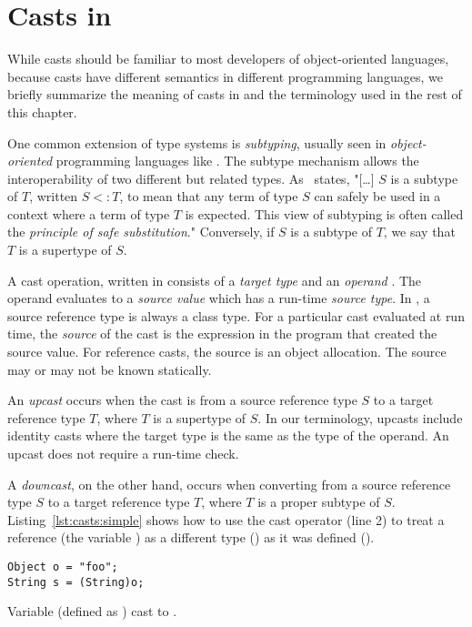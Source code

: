\section{Casts in \java{}}
\label{sec:casts:background}

While casts should be familiar to most developers of object-oriented languages,
because casts have different semantics in different programming languages,
we briefly summarize the meaning of casts in \java{} and the terminology used in the rest of this chapter.

One common extension of type systems is \emph{subtyping},
usually seen in \emph{object-oriented} programming languages like \java{}.
The subtype mechanism allows the interoperability of two different but related types.
As~\cite{pierceTypesProgrammingLanguages2002} states,
"[\ldots] $S$ is a subtype of $T$, written $S <: T$,
to mean that any term of type $S$ can safely be used in a context where a term of type $T$ is expected.
This view of subtyping is often called the \emph{principle of safe substitution}."
Conversely, if $S$ is a subtype of $T$, we say that $T$ is a supertype of $S$.

A cast operation, written  in \java{}
consists of a \emph{target type}  and an \emph{operand} .
The operand evaluates to a \emph{source value} which has a run-time
\emph{source type}.
In \java{}, a source reference type is always a class type.
For a particular cast evaluated at run time, 
the \emph{source} of the cast is the expression in the program that
created the source value.
For reference casts, the source is an object allocation.
The source may or may not be known statically.

An \emph{upcast} occurs when the cast is from a source reference type $S$ to a target reference type $T$,
where $T$ is a supertype of $S$.
In our terminology, upcasts include identity casts where the target type
is the same as the type of the operand.
An upcast does not require a run-time check.

A \emph{downcast}, on the other hand,
occurs when converting from a source reference type $S$ to a target reference
type $T$, where $T$ is a proper subtype of $S$.
Listing~\ref{lst:casts:simple} shows how to use the cast operator (line 2) to treat a reference (the variable ) as a different type () as it was defined ().

\begin{listing}
\begin{verbatim}
Object o = "foo"; 
String s = (String)o;
\end{verbatim}
\caption{Variable  (defined as ) cast to .}
\label{lst:casts:simple}
\end{listing}

